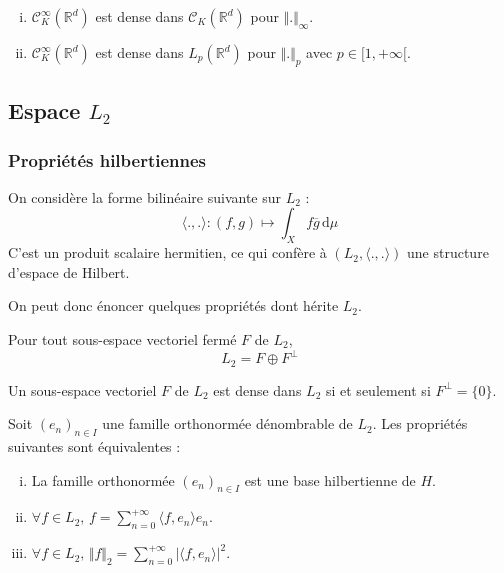 
	\begin{application}
		\begin{enumerate}[(i)]
			\item $\mathcal{C}^\infty_K(\mathbb{R}^d)$ est dense dans $\mathcal{C}_K(\mathbb{R}^d)$ pour $\Vert . \Vert_\infty$.
			\item $\mathcal{C}^\infty_K(\mathbb{R}^d)$ est dense dans $L_p(\mathbb{R}^d)$ pour $\Vert . \Vert_p$ avec $p \in [1, +\infty[$.
		\end{enumerate}
	\end{application}

	\subsection{Espace \texorpdfstring{$L_2$}{L₂}}

	\subsubsection{Propriétés hilbertiennes}


	\begin{definition}
		On considère la forme bilinéaire suivante sur $L_2$ :
		\[ \langle ., . \rangle : (f, g) \mapsto \int_X f \overline{g} \, \mathrm{d}\mu \]
		C'est un produit scalaire hermitien, ce qui confère à $(L_2, \langle ., . \rangle)$ une structure d'espace de Hilbert.
	\end{definition}

	On peut donc énoncer quelques propriétés dont hérite $L_2$.


	\begin{theorem}
		Pour tout sous-espace vectoriel fermé $F$ de $L_2$,
		\[ L_2 = F \oplus F^\perp \]
	\end{theorem}

	\begin{corollary}
		Un sous-espace vectoriel $F$ de $L_2$ est dense dans $L_2$ si et seulement si $F^\perp = \{ 0 \}$.
	\end{corollary}

	\begin{theorem}
		Soit $(e_n)_{n \in I}$ une famille orthonormée dénombrable de $L_2$. Les propriétés suivantes sont équivalentes :
		\begin{enumerate}[(i)]
			\item La famille orthonormée $(e_n)_{n \in I}$ est une base hilbertienne de $H$.
			\item $\forall f \in L_2, \, f = \sum_{n=0}^{+\infty} \langle f, e_n \rangle e_n$.
			\item $\forall f \in L_2, \, \Vert f \Vert_2 = \sum_{n=0}^{+\infty} \vert \langle f, e_n \rangle \vert^2$.
		\end{enumerate}
	\end{theorem}

